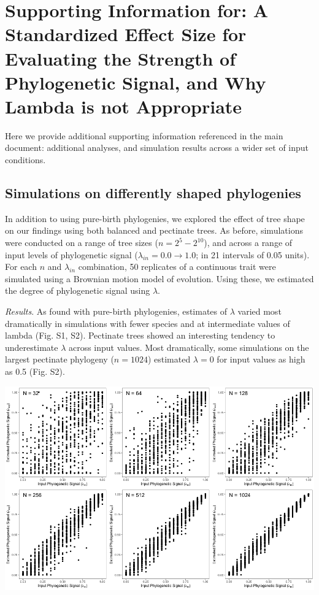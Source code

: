 \documentclass[]{article}
\author{}
\date{\vspace{-2.5em}}
\begin{document}
\hypertarget{supporting-information-for-a-standardized-effect-size-for-evaluating-the-strength-of-phylogenetic-signal-and-why-lambda-is-not-appropriate}{%
\section{Supporting Information for: A Standardized Effect Size for
Evaluating the Strength of Phylogenetic Signal, and Why Lambda is not
Appropriate}\label{supporting-information-for-a-standardized-effect-size-for-evaluating-the-strength-of-phylogenetic-signal-and-why-lambda-is-not-appropriate}}

Here we provide additional supporting information referenced in the main
document: additional analyses, and simulation results across a wider set
of input conditions.

\hypertarget{simulations-on-differently-shaped-phylogenies}{%
\subsection{Simulations on differently shaped
phylogenies}\label{simulations-on-differently-shaped-phylogenies}}

In addition to using pure-birth phylogenies, we explored the effect of
tree shape on our findings using both balanced and pectinate trees. As
before, simulations were conducted on a range of tree sizes
(\(n=2^5 - 2^{10}\)), and across a range of input levels of phylogenetic
signal (\(\lambda_{in} = 0.0 \to 1.0\); in 21 intervals of 0.05 units).
For each \(n\) and \(\lambda_{in}\) combination, 50 replicates of a
continuous trait were simulated using a Brownian motion model of
evolution. Using these, we estimated the degree of phylogenetic signal
using \(\lambda\). \hfill\break

\emph{Results}. As found with pure-birth phylogenies, estimates of
\(\lambda\) varied most dramatically in simulations with fewer species
and at intermediate values of lambda (Fig. S1, S2). Pectinate trees
showed an interesting tendency to underestimate \(\lambda\) across input
values. Most dramatically, some simulations on the largest pectinate
phylogeny (\(n = 1024\)) estimated \(\lambda = 0\) for input values as
high as 0.5 (Fig. S2).

\includegraphics[width=0.95\linewidth]{FigS1}
\end{document}
